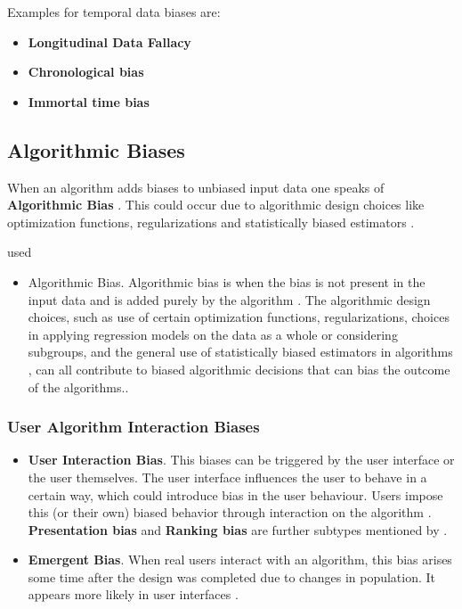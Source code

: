 \documentclass[12pt, a4paper, oneside]{book}   	%
\renewcommand{\paragraph}[1]{%
	\subsubsection*{#1}%
}
\newif\ifrawcitationactive
\newcommand{\rawcitationstart}{
	\color{purple}\rawcitationactivetrue
}
\newcommand{\rawcitationend}{
	\color{black}\rawcitationactivefalse
}
\newcommand{\rawcitationusedstart}{\color{violet}}
\newcommand{\rawcitationusedend}{%
	\ifrawcitationactive
	\color{purple}  %
	\else
	\color{black}  %
	\fi
}
\begin{document}
			Examples for temporal data biases are:
			\begin{itemize}
				\item \textbf{Longitudinal Data Fallacy} \autocite{Mehrabi_2021}
				\item \textbf{Chronological bias} \autocite{Chakraborty_2024, c9, c13}
				\item \textbf{Immortal time bias} \autocite{Chakraborty_2024, c24, c20}
			\end{itemize}
			
			\subsection{Algorithmic Biases}
			When an algorithm adds biases to unbiased input data one speaks of \textbf{Algorithmic Bias} \autocite{M9_Baeza-Yates_2018}. This could occur due to algorithmic design choices like optimization functions, regularizations and statistically biased estimators \autocite{M44_Danks_2017}.
			
			\rawcitationstart
			used
			\begin{itemize}		
				\rawcitationusedstart
				\item Algorithmic Bias. Algorithmic bias is when the bias is not present in the input data and is added purely by the algorithm \autocite{M9_Baeza-Yates_2018}. The algorithmic design choices, such as use of certain optimization functions, regularizations, choices in applying regression models on the data as a whole or considering subgroups, and the general use of statistically biased estimators in algorithms \autocite{M44_Danks_2017}, can all contribute to biased algorithmic decisions that can bias the outcome of the algorithms.\autocite{Mehrabi_2021}.
				\rawcitationusedend
			\end{itemize}
			\rawcitationend
				
			\paragraph{User Algorithm Interaction Biases}
				\begin{itemize}
					\item \textbf{User Interaction Bias}. This biases can be triggered by the user interface or the user themselves. The user interface influences the user to behave in a certain way, which could introduce bias in the user behaviour. Users impose this (or their own) biased behavior through interaction on the algorithm \autocite{M9_Baeza-Yates_2018}. \textbf{Presentation bias} and \textbf{Ranking bias} are further subtypes mentioned by \textcites{M93_Lerman_2014}{Mehrabi_2021}.
					\item \textbf{Emergent Bias}. When real users interact with an algorithm, this bias arises some time after the design was completed due to changes in population. It appears more likely in user interfaces \autocite{M53_Friedman_1996}.
				\end{itemize}
			
\end{document}
